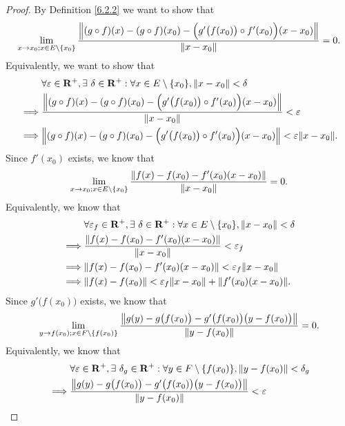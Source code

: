 \begin{proof}
    By Definition \ref{6.2.2} we want to show that
    \[
        \lim_{x \to x_0 ; x \in E \setminus \{x_0\}} \frac{\norm*{(g \circ f)(x) - (g \circ f)(x_0) - \Big(g'\big(f(x_0)\big) \circ f'(x_0)\Big)(x - x_0)}}{\norm*{x - x_0}} = 0.
    \]
    Equivalently, we want to show that
    \begin{align*}
                 & \forall \varepsilon \in \R^+, \exists\ \delta \in \R^+ : \forall x \in E \setminus \{x_0\}, \norm*{x - x_0} < \delta                  \\
        \implies & \frac{\norm*{(g \circ f)(x) - (g \circ f)(x_0) - \Big(g'\big(f(x_0)\big) \circ f'(x_0)\Big)(x - x_0)}}{\norm*{x - x_0}} < \varepsilon \\
        \implies & \norm*{(g \circ f)(x) - (g \circ f)(x_0) - \Big(g'\big(f(x_0)\big) \circ f'(x_0)\Big)(x - x_0)} < \varepsilon \norm*{x - x_0}.
    \end{align*}
    Since \(f'(x_0)\) exists, we know that
    \[
        \lim_{x \to x_0 ; x \in E \setminus \{x_0\}} \frac{\norm*{f(x) - f(x_0) - f'(x_0)(x - x_0)}}{\norm*{x - x_0}} = 0.
    \]
    Equivalently, we know that
    \begin{align*}
                 & \forall \varepsilon_f \in \R^+, \exists\ \delta \in \R^+ : \forall x \in E \setminus \{x_0\}, \norm*{x - x_0} < \delta \\
        \implies & \frac{\norm*{f(x) - f(x_0) - f'(x_0)(x - x_0)}}{\norm*{x - x_0}} < \varepsilon_f                                       \\
        \implies & \norm*{f(x) - f(x_0) - f'(x_0)(x - x_0)} < \varepsilon_f \norm*{x - x_0}                                               \\
        \implies & \norm*{f(x) - f(x_0)} < \varepsilon_f \norm*{x - x_0} + \norm*{f'(x_0)(x - x_0)}.
    \end{align*}
    Since \(g'\big(f(x_0)\big)\) exists, we know that
    \[
        \lim_{y \to f(x_0) ; x \in F \setminus \{f(x_0)\}} \frac{\norm*{g(y) - g\big(f(x_0)\big) - g'\big(f(x_0)\big)\big(y - f(x_0)\big)}}{\norm*{y - f(x_0)}} = 0.
    \]
    Equivalently, we know that
    \begin{align*}
                 & \forall \varepsilon \in \R^+, \exists\ \delta_g \in \R^+ : \forall y \in F \setminus \{f(x_0)\}, \norm*{y - f(x_0)} < \delta_g \\
        \implies & \frac{\norm*{g(y) - g\big(f(x_0)\big) - g'\big(f(x_0)\big)\big(y - f(x_0)\big)}}{\norm*{y - f(x_0)}} < \varepsilon             \\

\end{align*}
\end{proof}
